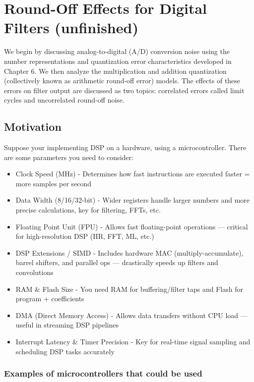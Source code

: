 \documentclass{article}
\begin{document}
\newpage

\section{Round-Off Effects for Digital Filters (unfinished)}
We begin by discussing analog-to-digital (A/D) conversion noise using the number representations and quantization error characteristics developed in Chapter 6. We then analyze the multiplication and addition
quantization (collectively known as arithmetic round-off error) models.
The effects of these errors on filter output are discussed as two topics:
correlated errors called limit cycles and uncorrelated round-off noise.

\subsection{Motivation}
Suppose your implementing DSP on a hardware, using a microcontroller. There are some parameters you need to consider:
\begin{itemize}
    \item Clock Speed (MHz) - Determines how fast instructions are executed  faster = more samples per second
    \item Data Width (8/16/32-bit) - Wider registers handle larger numbers and more precise calculations, key for filtering, FFTs, etc.
    \item Floating Point Unit (FPU) - Allows fast floating-point operations — critical for high-resolution DSP (IIR, FFT, ML, etc.)
    \item DSP Extensions / SIMD - Includes hardware MAC (multiply-accumulate), barrel shifters, and parallel ops — drastically speeds up filters and convolutions
    \item RAM \& Flash Size - You need RAM for buffering/filter taps and Flash for program + coefficients
    \item DMA (Direct Memory Access) - Allows data transfers without CPU load — useful in streaming DSP pipelines
    \item Interrupt Latency \& Timer Precision - Key for real-time signal sampling and scheduling DSP tasks accurately
\end{itemize}

\subsubsection{Examples of microcontrollers that could be used}
\end{document}
